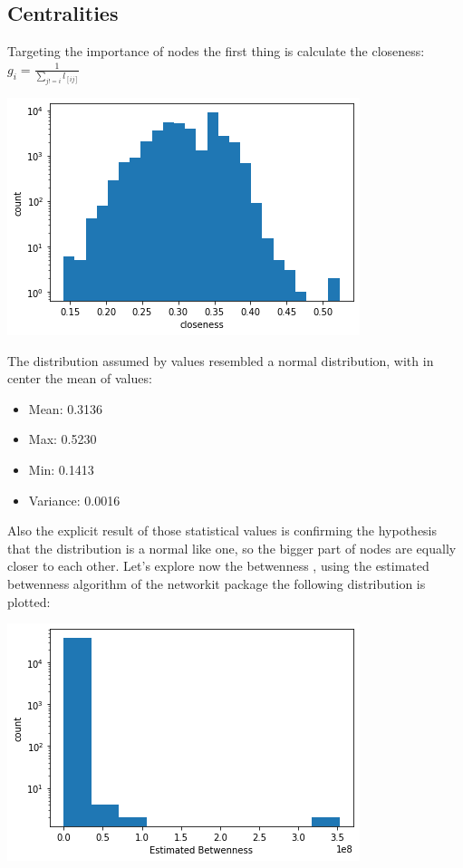 \documentclass[]{article}
\begin{document}
    \subsection*{Centralities}
    Targeting the importance of nodes the first thing is calculate the closeness: $g_i = \frac{1}{\sum_{j!=i}l_{[ij]}}$
    \begin{center}
        \includegraphics[scale=0.5]{charts/closeness_dist.png}
    \end{center}
    The distribution assumed by values resembled a normal distribution, with in center the mean of values:
    \begin{itemize}
        \item Mean: 0.3136
        \item Max: 0.5230
        \item Min: 0.1413
        \item Variance: 0.0016
    \end{itemize}
    Also the explicit result of those statistical values is confirming the hypothesis that the distribution is a normal like one, so the bigger part of nodes are equally closer to each other. Let's explore now the betwenness , using the estimated betwenness algorithm of the networkit package the following distribution is plotted:
    \begin{center}
        \includegraphics[scale=0.5]{charts/ebtw_dist.png}
    \end{center}
\end{document}
